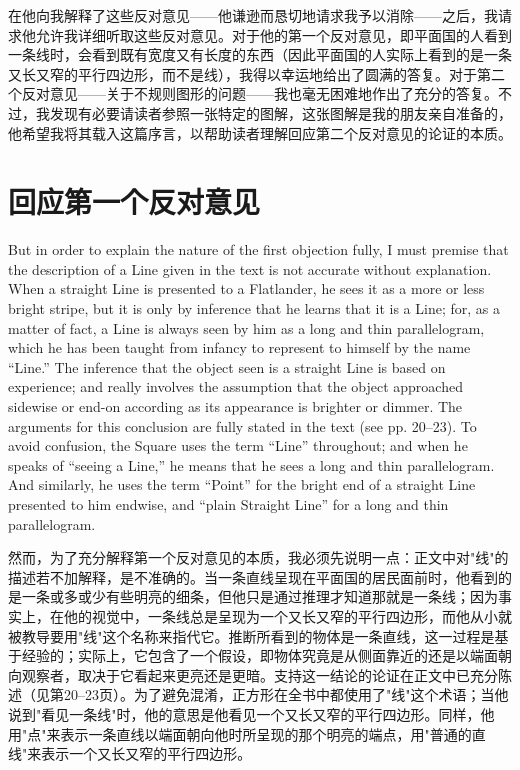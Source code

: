 \documentclass[12pt,UTF8]{ctexbook}
\begin{document}
在他向我解释了这些反对意见——他谦逊而恳切地请求我予以消除——之后，我请求他允许我详细听取这些反对意见。对于他的第一个反对意见，即平面国的人看到一条线时，会看到既有宽度又有长度的东西（因此平面国的人实际上看到的是一条又长又窄的平行四边形，而不是线），我得以幸运地给出了圆满的答复。对于第二个反对意见——关于不规则图形的问题——我也毫无困难地作出了充分的答复。不过，我发现有必要请读者参照一张特定的图解，这张图解是我的朋友亲自准备的，他希望我将其载入这篇序言，以帮助读者理解回应第二个反对意见的论证的本质。

\section*{回应第一个反对意见}

But in order to explain the nature of the first objection fully, I must premise that the description of a Line given in the text is not accurate without explanation. When a straight Line is presented to a Flatlander, he sees it as a more or less bright stripe, but it is only by inference that he learns that it is a Line; for, as a matter of fact, a Line is always seen by him as a long and thin parallelogram, which he has been taught from infancy to represent to himself by the name ``Line.'' The inference that the object seen is a straight Line is based on experience; and really involves the assumption that the object approached sidewise or end-on according as its appearance is brighter or dimmer. The arguments for this conclusion are fully stated in the text (see pp. 20--23). To avoid confusion, the Square uses the term ``Line'' throughout; and when he speaks of ``seeing a Line,'' he means that he sees a long and thin parallelogram. And similarly, he uses the term ``Point'' for the bright end of a straight Line presented to him endwise, and ``plain Straight Line'' for a long and thin parallelogram.

然而，为了充分解释第一个反对意见的本质，我必须先说明一点：正文中对"线"的描述若不加解释，是不准确的。当一条直线呈现在平面国的居民面前时，他看到的是一条或多或少有些明亮的细条，但他只是通过推理才知道那就是一条线；因为事实上，在他的视觉中，一条线总是呈现为一个又长又窄的平行四边形，而他从小就被教导要用"线"这个名称来指代它。推断所看到的物体是一条直线，这一过程是基于经验的；实际上，它包含了一个假设，即物体究竟是从侧面靠近的还是以端面朝向观察者，取决于它看起来更亮还是更暗。支持这一结论的论证在正文中已充分陈述（见第20--23页）。为了避免混淆，正方形在全书中都使用了"线"这个术语；当他说到"看见一条线"时，他的意思是他看见一个又长又窄的平行四边形。同样，他用"点"来表示一条直线以端面朝向他时所呈现的那个明亮的端点，用"普通的直线"来表示一个又长又窄的平行四边形。
\end{document}
